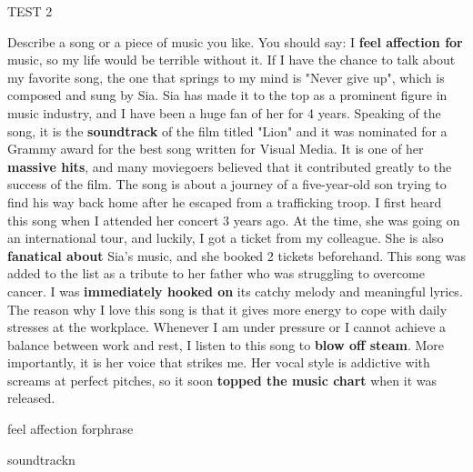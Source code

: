 \begin{glossarymc}[Cambridge 5]
\begin{test}{TEST 2}
\begin{qa}{Describe a song or a piece of music you like. You should say:}
        {I \textbf{feel affection for} music, so my life would be terrible without it. If I have the chance to talk about my favorite song, the one that springs to my mind is "Never give up", which is composed and sung by Sia. Sia has made it to the top as a prominent figure in music industry, and I have been a huge fan of her for 4 years. Speaking of the song, it is the \textbf{soundtrack} of the film titled "Lion" and it was nominated for a Grammy award for the best song written for Visual Media. It is one of her \textbf{massive hits}, and many moviegoers believed that it contributed greatly to the success of the film. The song is about a journey of a five-year-old son trying to find his way back home after he escaped from a trafficking troop. I first heard this song when I attended her concert 3 years ago. At the time, she was going on an international tour, and luckily, I got a ticket from my colleague. She is also \textbf{fanatical about} Sia's music, and she booked 2 tickets beforehand. This song was added to the list as a tribute to her father who was struggling to overcome cancer. I was \textbf{immediately hooked on} its catchy melody and meaningful lyrics. The reason why I love this song is that it gives more energy to cope with daily stresses at the workplace. Whenever I am under pressure or I cannot achieve a balance between work and rest, I listen to this song to \textbf{blow off steam}. More importantly, it is her voice that strikes me. Her vocal style is addictive with screams at perfect pitches, so it soon \textbf{topped the music chart} when it was released.}
    \end{qa}

        \begin{VocabExplain}[Part 2]
            \begin{ExplainCard}{feel affection for}{phrase}
            \end{ExplainCard}

            \begin{ExplainCard}{soundtrack}{n}
            \end{ExplainCard}


\end{VocabExplain}
\end{test}
\end{glossarymc}
